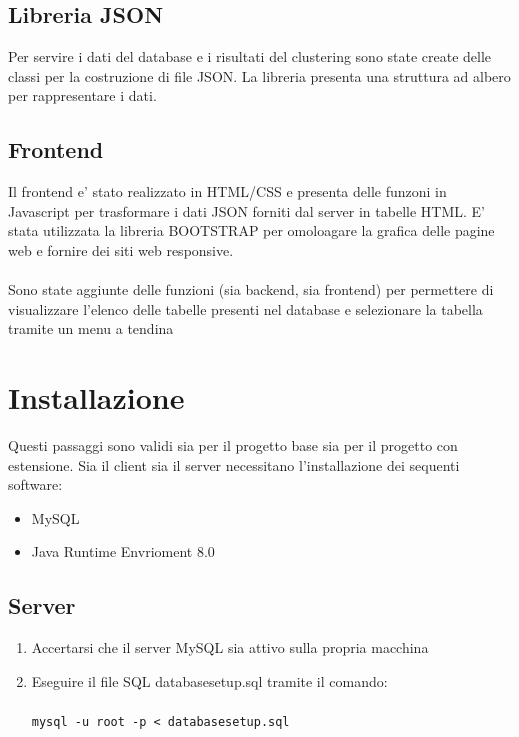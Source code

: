 \documentclass{article}
\begin{document}
        \subsection{Libreria JSON}
        Per servire i dati del database e i risultati del clustering sono state
        create delle classi per la costruzione di file JSON. La libreria
        presenta una struttura ad albero per rappresentare i dati.

        \subsection{Frontend}
        Il frontend e' stato realizzato in HTML/CSS e presenta delle funzoni 
        in Javascript per trasformare i dati JSON forniti dal server in tabelle
        HTML. E' stata utilizzata la libreria BOOTSTRAP per omoloagare la 
        grafica delle pagine web e fornire dei siti web responsive. \\\\
        Sono state aggiunte delle funzioni (sia backend, sia frontend)
        per permettere di visualizzare l'elenco delle tabelle 
        presenti nel database e selezionare la tabella 
        tramite un menu a tendina






    \newpage
    \section{Installazione}
    Questi passaggi sono validi sia per il progetto base sia per il progetto con
    estensione.
    Sia il client sia il server necessitano l'installazione dei sequenti
    software:
        \begin{itemize}
            \item MySQL
            \item Java Runtime Envrioment 8.0
        \end{itemize}

        \subsection{Server}
            \begin{enumerate}
                \item Accertarsi che il server MySQL sia attivo sulla propria
                macchina
                \item Eseguire il file SQL databasesetup.sql tramite il comando:
                    \\\\
                    \verb|mysql -u root -p < databasesetup.sql|
                
                
            \end{enumerate}
\end{document}
